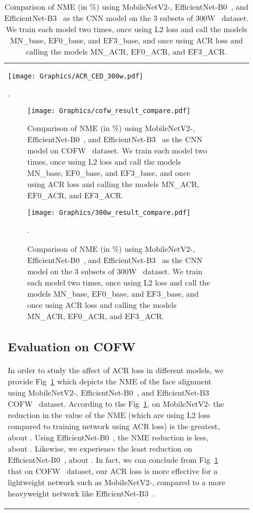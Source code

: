 \documentclass[a4paper,conference]{IEEEtran}
\begin{document}
\begin{table}[t!]
{\begin{tabular}{l c c}
\begin{figure*}[t]
  \centering
  \texttt{[image: Graphics/ACR\_CED\_300w.pdf]}
  \caption{CED curvature for the MN\textsubscript{ACR}, EF0\textsubscript{ACR}, and EF3\textsubscript{ACR} versus MN\textsubscript{base}, EF0\textsubscript{base}, and EF3\textsubscript{base} on 300W~\cite{sagonas2013300} dataset}.
  \label{fig:ACR_CED_300w}
\end{figure*}



\begin{figure}[t]
  \centering
  \texttt{[image: Graphics/cofw\_result\_compare.pdf]}
  \caption{Comparison of NME (in \%) using MobileNetV2-\cite{sandler2018mobilenetv2}, EfficientNet-B0~\cite{tan2020efficientnet}, and EfficientNet-B3~\cite{tan2020efficientnet} as the CNN model on COFW~\cite{burgos2013robust} dataset. We train each model two times, once using L2 loss and call the models MN\_base, EF0\_base, and EF3\_base, and once using ACR loss and calling the models MN\_ACR, EF0\_ACR, and EF3\_ACR.}
  \label{fig:cofw_result_compare}
\end{figure}
\begin{figure}[t]
  \centering
  \texttt{[image: Graphics/300w\_result\_compare.pdf]}
  \caption{Comparison of NME (in \%) using MobileNetV2-\cite{sandler2018mobilenetv2}, EfficientNet-B0~\cite{tan2020efficientnet}, and EfficientNet-B3~\cite{tan2020efficientnet} as the CNN model on the 3 subsets of 300W~\cite{sagonas2013300} dataset. We train each model two times, once using L2 loss and call the models MN\_base, EF0\_base, and EF3\_base, and once using ACR loss and calling the models MN\_ACR, EF0\_ACR, and EF3\_ACR.}.
  \label{fig:300w_result_compare}
\end{figure}




\subsection{Evaluation on COFW}
In order to study the affect of ACR loss in different models, we provide Fig~\ref{fig:cofw_result_compare} which depicts the NME of the face alignment using MobileNetV2-\cite{sandler2018mobilenetv2}, EfficientNet-B0~\cite{tan2020efficientnet}, and EfficientNet-B3~\cite{tan2020efficientnet} COFW~\cite{burgos2013robust} dataset. According to the Fig~\ref{fig:cofw_result_compare}, on MobileNetV2-\cite{sandler2018mobilenetv2} the reduction in the value of the NME (which are  using L2 loss compared to  training network using ACR loss) is the greatest, about . Using EfficientNet-B0~\cite{tan2020efficientnet}, the NME reduction is less, about . Likewise, we experience the least reduction on EfficientNet-B0~\cite{tan2020efficientnet}, about . In fact, we can conclude from Fig~\ref{fig:cofw_result_compare} that on COFW~\cite{burgos2013robust} dataset, our ACR loss is more effective for a lightweight network such as MobileNetV2-\cite{sandler2018mobilenetv2}, compared to a more heavyweight network like EfficientNet-B3~\cite{tan2020efficientnet}.


\end{tabular}}
\end{table}
\end{document}
